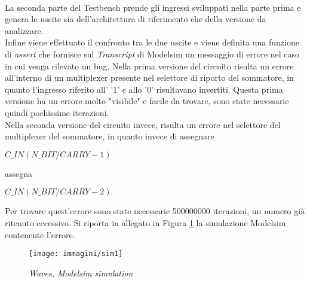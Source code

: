 \\
La seconda parte del Testbench prende gli ingressi sviluppati nella parte prima e genera le uscite sia dell'architettura di riferimento che della versione da analizzare.\\
Infine viene effettuato il confronto tra le due uscite e viene definita una funzione di \textit{assert} che fornisce sul \textit{Transcript} di Modelsim un messaggio di errore nel caso in cui venga rilevato un bug.
Nella prima versione del circuito risulta un errore all'interno di un multiplexer presente nel selettore di riporto del sommatore, in quanto l'ingresso riferito all' '1' e allo '0' risultavano invertiti. Questa prima versione ha un errore molto "visibile" e facile da trovare, sono state necessarie quindi pochissime iterazioni.\\
Nella seconda versione del circuito invece, risulta un errore nel selettore del multiplexer del sommatore, in quanto invece di assegnare
\begin{center}
	$C\_IN(N\_BIT/CARRY-1)$
\end{center} 
assegna 
\begin{center}
	$C\_IN(N\_BIT/CARRY-2)$
\end{center}
Per trovare quest'errore sono state necessarie 500000000 iterazioni, un numero già ritenuto eccessivo. Si riporta in allegato in Figura \ref{sim1} la simulazione Modelsim contenente l'errore.
\begin{figure}[!htb]
	\centering
	\texttt{[image: immagini/sim1]}
	\caption{\textit{Waves, Modelsim simulation}}
	\label{sim1}
\end{figure}
